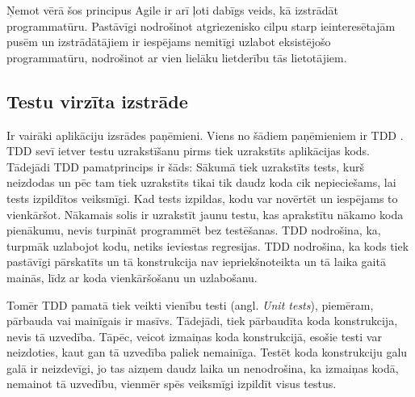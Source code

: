Ņemot vērā šos principus Agile ir arī ļoti dabīgs veids, kā izstrādāt programmatūru. Pastāvīgi nodrošinot atgriezenisko cilpu starp ieinteresētajām pusēm un izstrādātājiem ir iespējams nemitīgi uzlabot eksistējošo programmatūru, nodrošinot ar vien lielāku lietderību tās lietotājiem.
\cite{agile-man}


\subsection{Testu virzīta izstrāde}
Ir vairāki aplikāciju izsrādes paņēmieni. Viens no šādiem paņēmieniem ir TDD . TDD sevī ietver testu uzrakstīšanu pirms tiek uzrakstīts aplikācijas kods. Tādejādi TDD pamatprincips ir šāds: Sākumā tiek uzrakstīts tests, kurš neizdodas un pēc tam tiek uzrakstīts tikai tik daudz koda cik nepieciešams, lai tests izpildītos veiksmīgi. Kad tests izpildas, kodu var novērtēt un iespējams to vienkāršot. Nākamais solis ir uzrakstīt jaunu testu, kas aprakstītu nākamo koda pienākumu, nevis turpināt programmēt bez testēšanas. TDD nodrošina, ka, turpmāk uzlabojot kodu, netiks ieviestas regresijas. TDD nodrošina, ka kods tiek pastāvīgi pārskatīts un tā konstrukcija nav iepriekšnoteikta un tā laika gaitā mainās, līdz ar koda vienkāršošanu un uzlabošanu.

Tomēr TDD pamatā tiek veikti vienību testi (angl. \textit{Unit tests}), piemēram, pārbauda vai mainīgais ir masīvs. Tādejādi, tiek pārbaudīta koda konstrukcija, nevis tā uzvedība. Tāpēc, veicot izmaiņas koda konstrukcijā, esošie testi var neizdoties, kaut gan tā uzvedība paliek nemainīga. Testēt koda konstrukciju galu galā ir neizdevīgi, jo tas aizņem daudz laika un nenodrošina, ka izmaiņas kodā, nemainot tā uzvedību, vienmēr spēs veiksmīgi izpildīt visus testus. \cite[1. nodaļa]{chelimsky2010Rspec}

